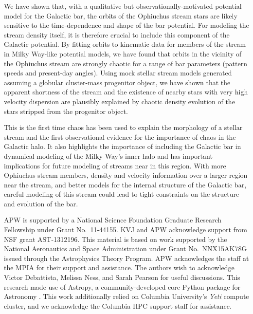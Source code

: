\documentclass[letterpaper,12pt,preprint]{aastex}
\begin{document}
We have shown that, with a qualitative but observationally-motivated potential model for the Galactic bar, the orbits of the Ophiuchus stream stars are likely sensitive to the time-dependence and shape of the bar potential. For modeling the stream density itself, it is therefore crucial to include this component of the Galactic potential. By fitting orbits to kinematic data for members of the stream in Milky Way-like potential models, we have found that orbits in the vicinity of the Ophiuchus stream are strongly chaotic for a range of bar parameters (pattern speeds and present-day angles). Using mock stellar stream models generated assuming a globular cluster-mass progenitor object, we have shown that the apparent shortness of the stream and the existence of nearby stars with very high velocity dispersion are plausibly explained by chaotic density evolution of the stars stripped from the progenitor object. 

This is the first time chaos has been used to explain the morphology of a stellar stream and the first observational evidence for the importance of chaos in the Galactic halo. It also highlights the importance of including the Galactic bar in dynamical modeling of the Milky Way's inner halo and has important implications for future modeling of streams near in this region. With more Ophiuchus stream members, density and velocity information over a larger region near the stream, and better models for the internal structure of the Galactic bar, careful modeling of this stream could lead to tight constraints on the structure and evolution of the bar.

\acknowledgements
APW is supported by a National Science Foundation Graduate Research Fellowship under Grant No.\ 11-44155.
KVJ and APW acknowledge support from NSF grant AST-1312196. 
This material is based on work supported by the National Aeronautics and Space Administration under Grant No.\, NNX15AK78G issued through the Astrophysics Theory Program. 
APW acknowledges the staff at the MPIA for their support and assistance.
The authors wish to acknowledge Victor Debattista, Melissa Ness, and Sarah Pearson for useful discussions.
This research made use of Astropy, a community-developed core Python package for Astronomy \citep{astropy13}.
This work additionally relied on Columbia University's \emph{Yeti} compute cluster, and we acknowledge the Columbia HPC support staff for assistance. \\

\end{document}

